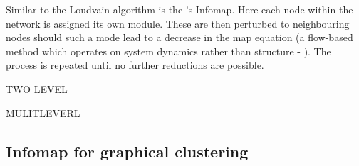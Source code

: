 Similar to the Loudvain algorithm is the \cite{infomap}'s Infomap. Here each node within the network is assigned its own module. These are then perturbed to neighbouring nodes should such a mode lead to a decrease in the map equation (a flow-based method which operates on system dynamics rather than structure - \citep{mapeqn}). The process is repeated until no further reductions are possible.

TWO LEVEL

MULITLEVERL


%

%


\subsection{Infomap for graphical clustering }


